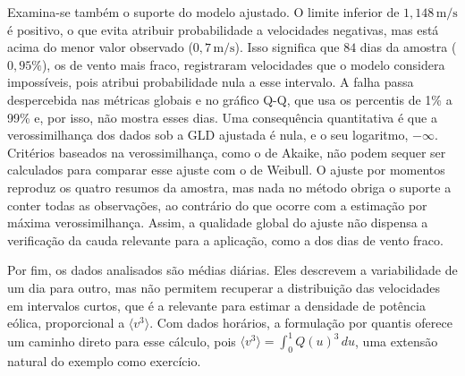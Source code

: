 Examina-se também o suporte do modelo ajustado. O limite inferior de $1{,}148\,\text{m/s}$ é positivo, o que evita atribuir probabilidade a velocidades negativas, mas está acima do menor valor observado ($0{,}7\,\text{m/s}$). Isso significa que $84$ dias da amostra ($0{,}95\%$), os de vento mais fraco, registraram velocidades que o modelo considera impossíveis, pois atribui probabilidade nula a esse intervalo. A falha passa despercebida nas métricas globais e no gráfico Q-Q, que usa os percentis de 1\% a 99\% e, por isso, não mostra esses dias. Uma consequência quantitativa é que a verossimilhança dos dados sob a GLD ajustada é nula, e o seu logaritmo, $-\infty$. Critérios baseados na verossimilhança, como o de Akaike, não podem sequer ser calculados para comparar esse ajuste com o de Weibull. O ajuste por momentos reproduz os quatro resumos da amostra, mas nada no método obriga o suporte a conter todas as observações, ao contrário do que ocorre com a estimação por máxima verossimilhança. Assim, a qualidade global do ajuste não dispensa a verificação da cauda relevante para a aplicação, como a dos dias de vento fraco.

Por fim, os dados analisados são médias diárias. Eles descrevem a variabilidade de um dia para outro, mas não permitem recuperar a distribuição das velocidades em intervalos curtos, que é a relevante para estimar a densidade de potência eólica, proporcional a $\langle v^3 \rangle$. Com dados horários, a formulação por quantis oferece um caminho direto para esse cálculo, pois $\langle v^3 \rangle = \int_0^1 Q(u)^3\,du$, uma extensão natural do exemplo como exercício.
